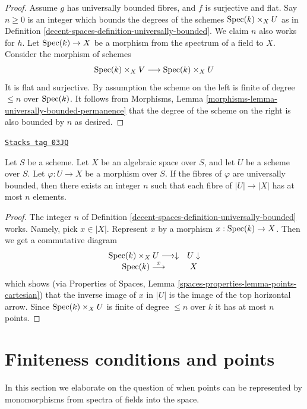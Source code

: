 \begin{proof}
Assume $g$ has universally bounded fibres, and $f$ is surjective and flat.
Say $n \geq 0$ is an integer which bounds the degrees of the schemes
$\operatorname{Spec}(k) \times_X U$ as in
Definition \ref{decent-spaces-definition-universally-bounded}.
We claim $n$ also works for $h$.
Let $\operatorname{Spec}(k) \to X$ be a morphism from the spectrum of a
field to $X$. Consider the morphism of schemes
$$
\operatorname{Spec}(k) \times_X V \longrightarrow \operatorname{Spec}(k) \times_X U
$$
It is flat and surjective. By assumption the scheme
on the left is finite of degree $\leq n$ over $\operatorname{Spec}(k)$.
It follows from
Morphisms, Lemma \ref{morphisms-lemma-universally-bounded-permanence}
that the degree of the scheme on the right is also bounded by $n$
as desired.
\end{proof}

\begin{lemma}
\label{decent-spaces-lemma-universally-bounded-finite-fibres}
\href{https://stacks.math.columbia.edu/tag/03JQ}{\texttt{Stacks tag 03JQ}}

Let $S$ be a scheme.
Let $X$ be an algebraic space over $S$, and let $U$ be a scheme over $S$.
Let $\varphi : U \to X$ be a morphism over $S$.
If the fibres of $\varphi$ are universally bounded, then there exists an
integer $n$ such that each fibre of $|U| \to |X|$ has at most
$n$ elements.
\end{lemma}

\begin{proof}
The integer $n$ of Definition \ref{decent-spaces-definition-universally-bounded} works.
Namely, pick $x \in |X|$. Represent $x$ by a morphism
$x : \operatorname{Spec}(k) \to X$. Then we get a commutative diagram
$$
\begin{array}{cc}\operatorname{Spec}(k) \times_X U \longrightarrow\downarrow & U \downarrow \\ \operatorname{Spec}(k) \overset{x}{\longrightarrow} & X\end{array}
$$
which shows (via
Properties of Spaces,
Lemma \ref{spaces-properties-lemma-points-cartesian})
that the inverse image of $x$ in $|U|$ is the image of
the top horizontal arrow. Since $\operatorname{Spec}(k) \times_X U$ is finite
of degree $\leq n$ over $k$ it has at most $n$ points.
\end{proof}

\section{Finiteness conditions and points}
\label{decent-spaces-section-points-monomorphisms}
In this section we elaborate on the question of when points can be represented
by monomorphisms from spectra of fields into the space.

